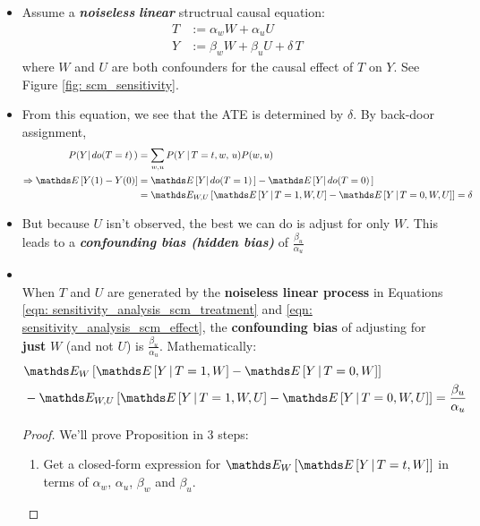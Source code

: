 \documentclass[11pt]{article}
\begin{document}
\begin{itemize}
\item Assume a \emph{\textbf{noiseless}} \emph{\textbf{linear}} structrual causal equation:
\begin{align}
T &:= \alpha_{w} W +  \alpha_u U  \label{eqn: sensitivity_analysis_scm_treatment}\\
Y &:= \beta_{w} W +  \beta_u U + \delta\,T \label{eqn: sensitivity_analysis_scm_effect}
\end{align} where $W$ and $U$ are both confounders for the causal effect of $T$ on $Y$. See Figure \ref{fig: scm_sensitivity}.

\item From this equation, we see that the ATE is determined by $\delta$. By back-door assignment, 
\begin{align*}
P(Y |\, do(T=t)\,) &= \sum_{w, u}P(Y \,|\, T=t, w, \, u)P(w, u) \\
\Rightarrow \E{}{Y(1) - Y(0)}  &=  \E{}{Y|\,do(T=1)\,} - \E{}{Y|\,do(T=0)\,} \\
&= \E{W, U}{\E{}{Y \,|\, T=1, W, U} - \E{}{Y \,|\, T=0, W, U}} = \delta
\end{align*}

\item But because $U$ isn’t observed, the best we can do is adjust for only $W$. This leads to a \emph{\textbf{confounding bias (hidden bias)}} of $\frac{\beta_{u}}{\alpha_u}$

\item \begin{proposition}  \citep{neal2020introduction} \\
 When $T$ and $U$ are generated by the \textbf{noiseless linear process} in Equations \eqref{eqn: sensitivity_analysis_scm_treatment} and \eqref{eqn: sensitivity_analysis_scm_effect}, the \textbf{confounding bias} of adjusting for \textbf{just} $W$ (and not $U$) is $\frac{\beta_{u}}{\alpha_u}$. Mathematically:
 \begin{align}
 &\E{W}{\E{}{Y \,|\, T=1, W} - \E{}{Y \,|\, T=0, W}} \nonumber\\
 &-  \E{W, U}{\E{}{Y \,|\, T=1, W, U} - \E{}{Y \,|\, T=0, W, U}} = \frac{\beta_{u}}{\alpha_u} \label{eqn: sensitivity_analysis_linear}
 \end{align}
 \end{proposition}
 \begin{proof}
 We’ll prove Proposition  in 3 steps:
 \begin{enumerate}
 \item Get a closed-form expression for $\E{W}{\E{}{Y \,|\, T=t, W}}$ in terms of
$\alpha_{w}$, $\alpha_u$, $\beta_w$ and $\beta_u$.


\end{enumerate}
\end{proof}
\end{itemize}
\end{document}
